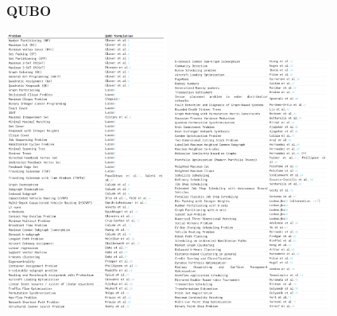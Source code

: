 \documentclass {beamer}
\begin{document}
\begin {frame}
\frametitle {QUBO}

\begin {center}
\includegraphics[width=0.4\textwidth] {qubolist1}
\includegraphics[width=0.4\textwidth] {qubolist2}
\cite {qubolist}
\end {center}

\end {frame}
\end{document}
